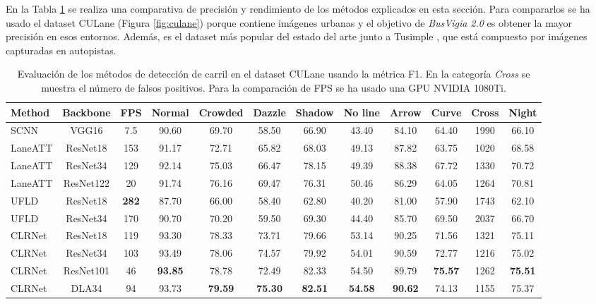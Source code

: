\documentclass[a4paper, oneside, onecolumn, 11pt]{article}
\begin{document}
En la Tabla \ref{table:metodos_lane} se realiza una comparativa de precisión y rendimiento de los métodos explicados en esta sección. Para compararlos se ha usado el dataset CULane \cite{Pan2018} (Figura \ref{fig:culane}) porque contiene imágenes urbanas y el objetivo de \textit{BusVigia 2.0} es obtener la mayor precisión en esos entornos. Además, es el dataset más popular del estado del arte junto a Tusimple \cite{tusimple}, que está compuesto por imágenes capturadas en autopistas.

\begin{table}
\begin{center}
\begin{adjustbox}{width=\textwidth}
\begin{tabular}{l c c c c c c c c c c c}
\hline
Method & Backbone & FPS & Normal & Crowded & Dazzle & Shadow & No line & Arrow & Curve & Cross & Night \\
\hline
SCNN \cite{Pan2018} & VGG16 & 7.5 & 90.60 & 69.70 & 58.50 & 66.90 & 43.40 & 84.10 & 64.40 & 1990 & 66.10 \\
LaneATT \cite{tabelini2021keep} & ResNet18 & 153 & 91.17 & 72.71 & 65.82 & 68.03 & 49.13 & 87.82 & 63.75 & 1020 & 68.58 \\
LaneATT \cite{tabelini2021keep} & ResNet34 & 129 & 92.14 & 75.03 & 66.47 & 78.15 & 49.39 & 88.38 & 67.72 & 1330 & 70.72 \\
LaneATT \cite{tabelini2021keep} & ResNet122 & 20 & 91.74 & 76.16 & 69.47 & 76.31 & 50.46 & 86.29 & 64.05 & 1264 & 70.81 \\
UFLD \cite{Qin2020} & ResNet18 & \textbf{282} & 87.70 & 66.00 & 58.40 & 62.80 & 40.20 & 81.00 & 57.90 & 1743 & 62.10 \\
UFLD \cite{Qin2020} & ResNet34 & 170 & 90.70 & 70.20 & 59.50 & 69.30 & 44.40 & 85.70 & 69.50 & 2037 & 66.70 \\
CLRNet \cite{zheng2022clrnet} & ResNet18 & 119 & 93.30 & 78.33 & 73.71 & 79.66 & 53.14 & 90.25 & 71.56 & 1321 & 75.11 \\
CLRNet \cite{zheng2022clrnet} & ResNet34 & 103 & 93.49 & 78.06 & 74.57 & 79.92 & 54.01 & 90.59 & 72.77 & 1216 & 75.02 \\
CLRNet \cite{zheng2022clrnet} & ResNet101 & 46 & \textbf{93.85} & 78.78 & 72.49 & 82.33 & 54.50 & 89.79 & \textbf{75.57} & 1262 & \textbf{75.51} \\
CLRNet \cite{zheng2022clrnet} & DLA34 & 94 & 93.73 & \textbf{79.59} & \textbf{75.30} & \textbf{82.51} & \textbf{54.58} & \textbf{90.62} & 74.13 & 1155 & 75.37 \\
\hline
\end{tabular}
\end{adjustbox}
\end{center}
\caption{Evaluación de los métodos de detección de carril en el dataset CULane \cite{Pan2018} usando la métrica F1. En la categoría \textit{Cross} se muestra el número de falsos positivos. Para la comparación de FPS se ha usado una GPU NVIDIA 1080Ti.}
\label{table:metodos_lane}
\end{table}
\end{document}
